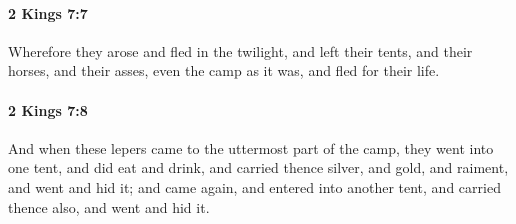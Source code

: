 		\paragraph{2 Kings 7:7} %
			\label{2KINGS-7-7}

			Wherefore they arose and fled in the twilight, and left their tents, and their horses, and their asses, even the camp as it was, and fled for their life.


		\paragraph{2 Kings 7:8} %
			\label{2KINGS-7-8}

			And when these lepers came to the uttermost part of the camp, they went into one tent, and did eat and drink, and carried thence silver, and gold, and raiment, and went and hid it; and came again, and entered into another tent, and carried thence also, and went and hid it.

